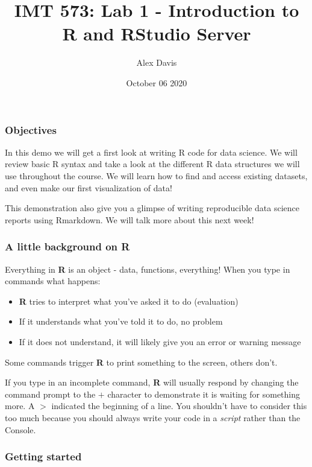 \documentclass[
]{article}
\title{IMT 573: Lab 1 - Introduction to R and RStudio Server}
\author{Alex Davis}
\date{October 06 2020}
\providecommand{\tightlist}{%
  \setlength{\itemsep}{0pt}\setlength{\parskip}{0pt}}
\begin{document}
\maketitle

\hypertarget{objectives}{%
\subsubsection{Objectives}\label{objectives}}

In this demo we will get a first look at writing R code for data
science. We will review basic R syntax and take a look at the different
R data structures we will use throughout the course. We will learn how
to find and access existing datasets, and even make our first
visualization of data!

This demonstration also give you a glimpse of writing reproducible data
science reports using Rmarkdown. We will talk more about this next week!

\hypertarget{a-little-background-on-r}{%
\subsubsection{A little background on
R}\label{a-little-background-on-r}}

Everything in \textbf{R} is an object - data, functions, everything!
When you type in commands what happens:

\begin{itemize}
\tightlist
\item
  \textbf{R} tries to interpret what you've asked it to do (evaluation)
\item
  If it understands what you've told it to do, no problem
\item
  If it does not understand, it will likely give you an error or warning
  message
\end{itemize}

Some commands trigger \textbf{R} to print something to the screen,
others don't.

If you type in an incomplete command, \textbf{R} will usually respond by
changing the command prompt to the \(+\) character to demonstrate it is
waiting for something more. A \(>\) indicated the beginning of a line.
You shouldn't have to consider this too much because you should always
write your code in a \emph{script} rather than the Console.

\hypertarget{getting-started}{%
\subsubsection{Getting started}\label{getting-started}}
\end{document}
